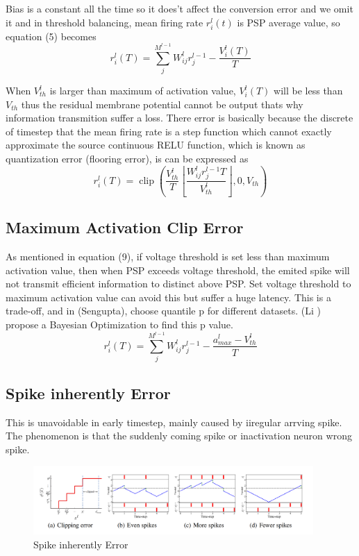 \documentclass{article}
\begin{document}
Bias is a constant all the time so it does't affect the conversion error and we omit it and in threshold balancing, mean firing rate $r_i^l(t)$ is PSP average value, so equation (5) becomes
\begin{equation}
  r_i^l(T) = \sum_j^{M^{l-1}}W_{ij}^lr_j^{l-1} - \frac{V_i^l(T)}{T}
\end{equation}

When $V_{th}^l$ is larger than maximum of activation value, $V_i^l(T)$ will be less than $V_{th}$ thus the residual membrane potential cannot be output thats why information transmition suffer a loss.
There error is basically because the discrete of timestep that the mean firing rate is a step function which cannot exactly approximate the source continuous RELU function, which is known as quantization error (flooring error), is can be expressed as
\begin{equation}
  r_i^l(T) = \operatorname{clip}\left(\frac{V_{th}^l}{T}\left\lfloor\frac{W_{ij}^lr_j^{l-1}T}{V_{th}^l}\right\rfloor, 0, V_{th}\right)
\end{equation}

\subsection{Maximum Activation Clip Error}
As mentioned in equation (9), if voltage threshold is set less than maximum activation value, then when PSP exceeds voltage threshold, the emited spike will not transmit efficient information to distinct above PSP.
Set voltage threshold to maximum activation value can avoid this but suffer a huge latency. This is a trade-off, and in (Sengupta), choose quantile p for different datasets. (Li ) propose a Bayesian Optimization to find this p value.
\begin{equation}
  r_i^l(T) = \sum_j^{M^{l-1}}W_{ij}^lr_j^{l-1} - \frac{a_{max}^l-V_{th}^l}{T}
\end{equation}

\subsection{Spike inherently Error}
This is unavoidable in early timestep, mainly caused by iiregular arrving spike. The phenomenon is that the suddenly coming spike or inactivation neuron wrong spike.
\begin{figure}[htbp]
  \centering
  \includegraphics[width=0.95\textwidth]{test2.png}
  \caption{Spike inherently Error}
\end{figure}
\end{document}
